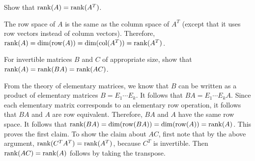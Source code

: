 \begin{enumialphparenastyle}
\begin{ex}
  Show that $\rank(A)=\rank(A^T)$.
  \begin{sol}
    The row space of $A$ is the same as the column space of $A^T$
    (except that it uses row vectors instead of column
    vectors). Therefore, $\rank(A) = \dim(\row(A)) = \dim(\col(A^T)) =
    \rank(A^T)$.
  \end{sol}
\end{ex}

\begin{ex}
  For invertible matrices $B$ and $C$ of appropriate size, show that
  $\rank(A) = \rank(BA) = \rank(AC)$.
  \begin{sol}
    From the theory of elementary matrices, we know that $B$ can be
    written as a product of elementary matrices $B=E_1\cdots E_k$.  It
    follows that $BA = E_1\cdots E_kA$. Since each elementary matrix
    corresponds to an elementary row operation, it follows that $BA$
    and $A$ are row equivalent. Therefore, $BA$ and $A$ have the same
    row space. It follows that
    $\rank(BA) = \dim(\row(BA)) = \dim(\row(A)) = \rank(A)$. This
    proves the first claim. To show the claim about $AC$, first note
    that by the above argument, $\rank(C^TA^T) = \rank(A^T)$, because
    $C^T$ is invertible. Then $\rank(AC)=\rank(A)$ follows by taking
    the transpose.
  \end{sol}
\end{ex}


\end{enumialphparenastyle}
